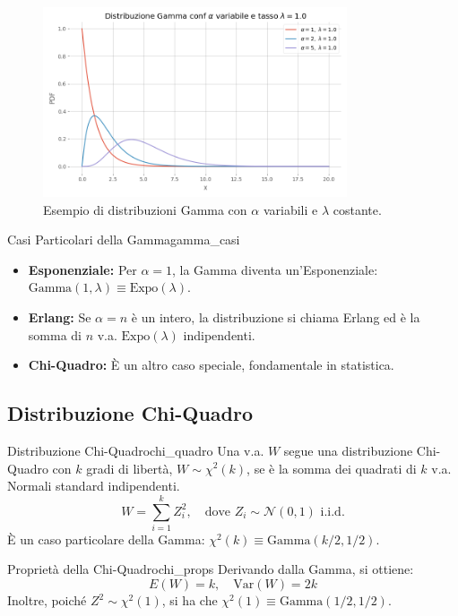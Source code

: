 \begin{figure}[H]
    \centering
    \includegraphics[width=0.8\textwidth]{images/th_01_03/gamma.png}
    \caption{Esempio di distribuzioni Gamma con \(\alpha\) variabili e \(\lambda\) costante.}
    \label{fig:gamma}
\end{figure}

\begin{nota}{Casi Particolari della Gamma}{gamma_casi}
\begin{itemize}
    \item \textbf{Esponenziale:} Per \(\alpha=1\), la Gamma diventa un'Esponenziale: \(\text{Gamma}(1, \lambda) \equiv \text{Expo}(\lambda)\).
    \item \textbf{Erlang:} Se \(\alpha=n\) è un intero, la distribuzione si chiama Erlang ed è la somma di \(n\) v.a. \(\text{Expo}(\lambda)\) indipendenti.
    \item \textbf{Chi-Quadro:} È un altro caso speciale, fondamentale in statistica.
\end{itemize}
\end{nota}

\subsection{Distribuzione Chi-Quadro}
\begin{definizione}{Distribuzione Chi-Quadro}{chi_quadro}
Una v.a. \(W\) segue una distribuzione Chi-Quadro con \(k\) gradi di libertà, \(W \sim \chi^2(k)\), se è la somma dei quadrati di \(k\) v.a. Normali standard indipendenti.
\[
W = \sum_{i=1}^k Z_i^2, \quad \text{dove } Z_i \sim \mathcal{N}(0,1) \text{ i.i.d.}
\]
È un caso particolare della Gamma: \( \chi^2(k) \equiv \text{Gamma}(k/2, 1/2) \).
\end{definizione}

\begin{nota}{Proprietà della Chi-Quadro}{chi_props}
Derivando dalla Gamma, si ottiene:
\[ E(W) = k, \quad \text{Var}(W) = 2k \]
Inoltre, poiché \( Z^2 \sim \chi^2(1) \), si ha che \(\chi^2(1) \equiv \text{Gamma}(1/2, 1/2)\).
\end{nota}

